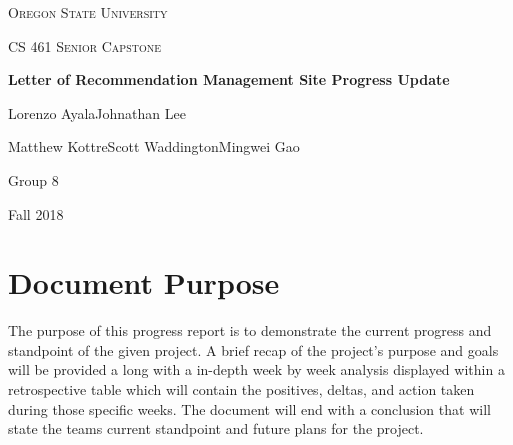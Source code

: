\documentclass[compsoc, draftclsnofoot, onecolumn, letterpaper, 10pt]{IEEEtran}
\begin{document}
\begin{titlepage}
     \centering
     {\scshape\LARGE Oregon State University \par}
     \vspace{1cm}
     {\scshape\Large CS 461 Senior Capstone\par}
     \vspace{1.5cm}
     {\huge\bfseries Letter of Recommendation Management Site Progress Update\par}
     \vspace{2cm}
     {\Large Lorenzo Ayala\hspace{0.75cm}Johnathan Lee\par 
     Matthew Kottre\hspace{0.75cm}Scott Waddington\hspace{0.75cm}Mingwei Gao\par}
    \vfill

    \begin{abstract}
        This document provides an overview of the state of the project as of the end of Fall Term 2018. Included is the purpose of this project, as well as any issues, concerns, goals, and early implementation so far.
    \end{abstract}

    \vfill

    {\large Group 8\par}
    {\large Fall 2018\par}
\end{titlepage}

\tableofcontents
\newpage

\section{Document Purpose}
The purpose of this progress report is to demonstrate the current progress and standpoint of the given project. A brief recap of the project's purpose and goals will be provided a long with a in-depth week by week analysis displayed within a retrospective table which will contain the positives, deltas, and action taken during those specific weeks. The document will end with a conclusion that will state the teams current standpoint and future plans for the project. 
\end{document}

